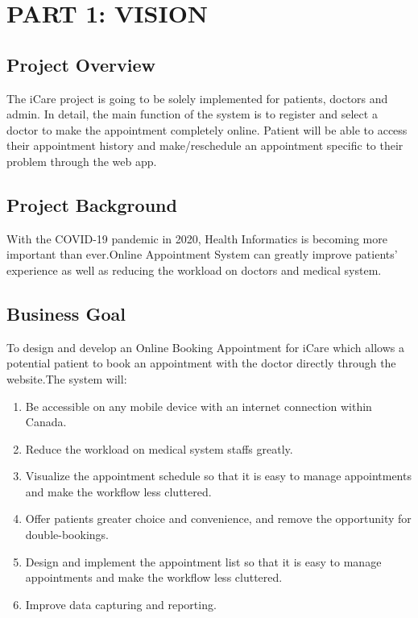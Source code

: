 \documentclass[a4paper,12pt]{report}
\begin{document}
\renewcommand*\contentsname{TABLE OF CONTENT}
\tableofcontents

\listoffigures

\newpage
{}
\chapter*{PART 1: VISION}



\section*{Project Overview}
The iCare project is going to be solely implemented for patients, doctors and admin. In detail, the main function of the system is to register and select a doctor to make the appointment completely online. Patient will be able to access their appointment history and make/reschedule an appointment specific to their problem through the web app.
\section*{Project Background}
With the COVID-19 pandemic in 2020, Health Informatics is becoming more important than ever.Online Appointment System can greatly improve patients' experience as well as reducing the workload on doctors and medical system.
 
\section*{Business Goal}
To design and develop an Online Booking Appointment for iCare which allows a potential patient to book an appointment with the doctor directly through the website.The system will:
\begin{enumerate}
\item Be accessible on any mobile device with an internet connection within Canada.
\item Reduce the workload on medical system staffs greatly.
\item Visualize the appointment schedule so that it is easy to manage appointments and make the workflow less cluttered.
\item Offer patients greater choice and convenience, and remove the opportunity for double-bookings.
\item Design and implement the appointment list so that it is easy to manage appointments and make the workflow less cluttered.
\item Improve data capturing and reporting.
    
\end{enumerate}
\end{document}
